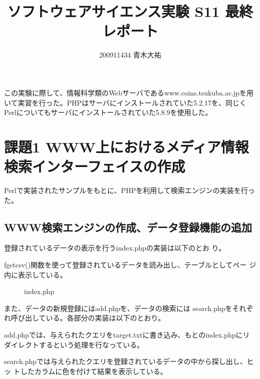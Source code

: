 \documentclass[a4paper,9pt]{jsarticle}
\title{ソフトウェアサイエンス実験 S11 最終レポート}
\author{200911434 青木大祐}
\begin{document}
\maketitle
\newpage

この実験に際して、情報科学類のWebサーバであるwww.coins.tsukuba.ac.jpを用
いて実習を行った。PHPはサーバにインストールされていた5.2.17を、同じく
Perlについてもサーバにインストールされていた5.8.9を使用した。

\section{課題1 WWW上におけるメディア情報検索インターフェイスの作成}
Perlで実装されたサンプルをもとに、PHPを利用して検索エンジンの実装を行っ
た。
\subsection{WWW検索エンジンの作成、データ登録機能の追加}
登録されているデータの表示を行う{\ttfamily index.php}の実装は以下のとお
り。


fgetcsv()関数を使って登録されているデータを読み出し、テーブルとしてペー
ジ内に表示している。\\
\begin{figure}[H]
 \caption{index.php}
 \begin{center}
 \end{center}
\end{figure}

また、データの新規登録には{\ttfamily add.php}を、データの検索には{\ttfamily
search.php}をそれぞれ呼び出している。各部分の実装は以下のとおり。


add.phpでは、与えられたクエリをtarget.txtに書き込み、もとのindex.phpにリ
ダイレクトするという処理を行なっている。


search.phpでは与えられたクエリを登録されているデータの中から探し出し、ヒッ
トしたカラムに色を付けて結果を表示している。
\end{document}
